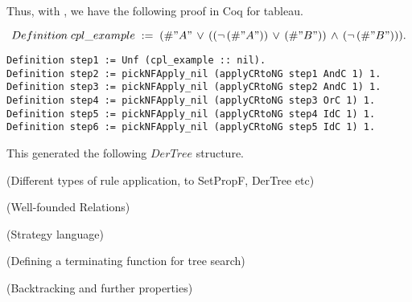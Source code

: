 Thus, with , we have the following proof in Coq for
tableau.

$$
Definition\; cpl\_example\; :=\; (\#"A"\, \vee\, ((\neg\, (\#"A"))\, \vee\, (\# "B"))\, \wedge\, (\neg\, (\# "B"))).
$$

\begin{lstlisting}
Definition step1 := Unf (cpl_example :: nil).
Definition step2 := pickNFApply_nil (applyCRtoNG step1 AndC 1) 1.
Definition step3 := pickNFApply_nil (applyCRtoNG step2 AndC 1) 1.
Definition step4 := pickNFApply_nil (applyCRtoNG step3 OrC 1) 1.
Definition step5 := pickNFApply_nil (applyCRtoNG step4 IdC 1) 1.
Definition step6 := pickNFApply_nil (applyCRtoNG step5 IdC 1) 1.
\end{lstlisting}

This generated the following $DerTree$ structure.

\newpage

(Different types of rule application, to SetPropF, DerTree etc)

(Well-founded Relations)

(Strategy language)

(Defining a terminating function for tree search)

(Backtracking and further properties)


